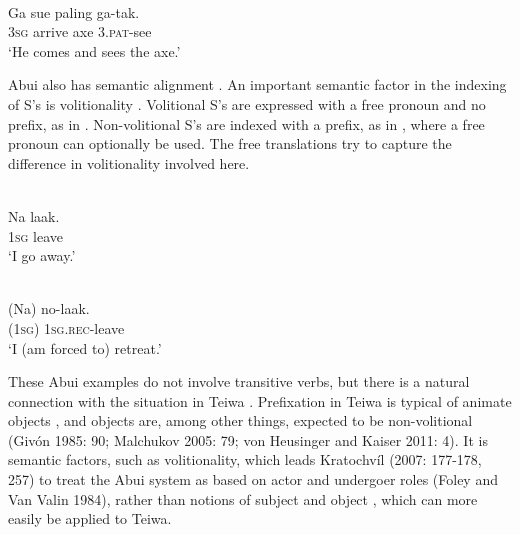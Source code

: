 \ea%
\label{bkm:Ref383697282}
 \\
\gll    Ga  sue  paling  ga-tak. \\  
      3\textsc{sg} arrive  axe  3.\textsc{pat}{}-see  \\
\glt  `He comes and sees the axe.'
\z

 





Abui  also has semantic alignment . An important semantic factor in the indexing of S's is volitionality . Volitional S's are expressed with a free pronoun  and no prefix, as in . Non-volitional S's are indexed with a prefix, as in , where a free pronoun can optionally be used. The free translations try to capture the difference in volitionality involved here.


\ea%
\label{bkm:Ref306280914}
 \\
\gll     Na  laak.\\  
     1\textsc{sg} leave \\
\glt  `I go away.'
\z








\ea%
\label{bkm:Ref306280918}
 \\ 
\gll     (Na)  no-laak.\\  
     (1\textsc{sg})  1\textsc{sg.rec}{}-leave \\
\glt  `I (am forced to) retreat.'
\z







These Abui  examples do not involve transitive verbs, but there is a natural connection with the situation in Teiwa . Prefixation in Teiwa is typical of animate objects  , and objects are, among other things, expected to be non-volitional  (Giv\'on 1985: 90; Malchukov 2005: 79; von Heusinger and Kaiser 2011: 4). It is semantic factors, such as volitionality, which leads Kratochv\'il (2007: 177-178, 257) to treat the Abui system as based on actor  and undergoer  roles (Foley and Van Valin 1984), rather than notions of subject  and object , which can more easily be applied to Teiwa.

